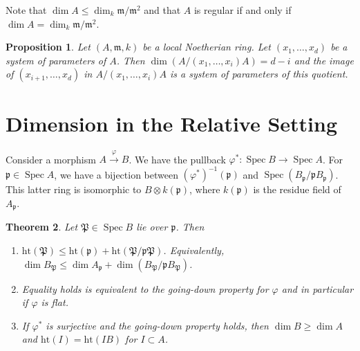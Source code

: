 \documentclass[leqno, openany]{memoir}
\newtheorem{thm}{Theorem}[section]
\newtheorem{prop}[thm]{Proposition}
\theoremstyle{definition}
\theoremstyle{remark}
\theoremstyle{plain}
\theoremstyle{definition}
\theoremstyle{remark}
\newcommand{\mf}[1]{\mathfrak{#1}}
\newcommand{\mr}[1]{\mathrm{#1}}
\DeclareMathOperator{\Spec}{Spec}
\begin{document}
Note that $\dim A \leq \dim_k \mf{m} / \mf{m}^2$ and that $A$ is regular if and
only if $\dim A = \dim_k \mf{m} / \mf{m}^2$.

\begin{prop} Let $(A, \mf{m}, k)$ be a local Noetherian ring. Let $(x_1,
    \ldots, x_d)$ be a system of parameters of $A$. Then $\dim(A / (x_1,
    \ldots, x_i)A) = d-i$ and the image of $(x_{i+1}, \ldots, x_d)$ in $A /
    (x_1, \ldots, x_i)A$ is a system of parameters of this quotient.
\end{prop}

\section{Dimension in the Relative Setting}%
\label{sec:dimension_in_the_relative_setting}

Consider a morphism $A \xrightarrow{\varphi} B$. We have the pullback
$\varphi^* \colon \Spec B \to \Spec A$. For $\mf{p} \in \Spec A$, we have a
bijection between $(\varphi^*)^{-1}(\mf{p})$ and $\Spec(B_{\mf{p}} /
\mf{p}B_{\mf{p}})$. This latter ring is isomorphic to $B \otimes k(\mf{p})$,
where $k (\mf{p})$ is the residue field of $A_{\mf{p}}$.

\begin{thm} Let $\mf{P} \in \Spec B$ lie over $\mf{p}$. Then \begin{enumerate}
    \item $\mr{ht}(\mf{P}) \leq \mr{ht}(\mf{p}) + \mr{ht}(\mf{P} /
        \mf{p}\mf{P})$. Equivalently, $\dim B_{\mf{P}} \leq \dim A_{\mf{p}} +
        \dim (B_{\mf{P}} / \mf{p}B_{\mf{P}})$.  \item Equality holds is
        equivalent to the going-down property for $\varphi$ and in particular
        if $\varphi$ is flat.  \item If $\varphi^*$ is surjective and the
        going-down property holds, then $\dim B \geq \dim A$ and $\mr{ht}(I) =
        \mr{ht}(IB)$ for $I \subset A$.  \end{enumerate} \end{thm}
\end{document}
